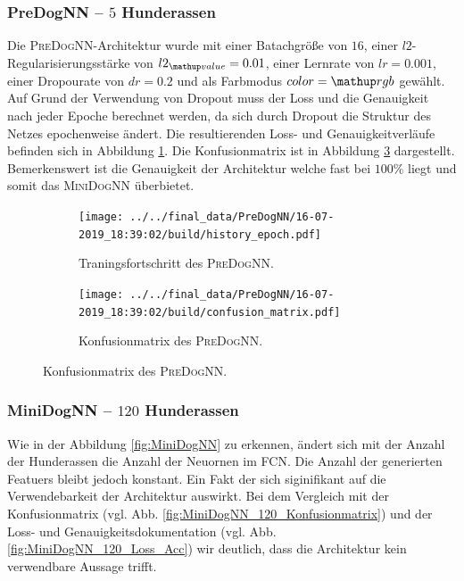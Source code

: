 \subsubsection{PreDogNN -- $5$ Hunderassen}
Die \textsc{PreDogNN}-Architektur wurde mit einer Batachgröße von $16$, einer
$l2$-Regularisierungsstärke von $l2\ua{value}=0.01$, einer Lernrate von
$lr=0.001$, einer Dropourate von $dr=0.2$ und als Farbmodus $color=\map{rgb}$ gewählt.
Auf Grund der Verwendung von Dropout muss der Loss und die Genauigkeit nach jeder
Epoche berechnet werden, da sich durch Dropout die Struktur des Netzes epochenweise
ändert. Die resultierenden Loss- und Genauigkeitverläufe befinden sich in Abbildung
\ref{fig:PreDogNN_Loss_Acc}. Die Konfusionmatrix ist in Abbildung \ref{fig:PreDogNN_Konfusionmatrix}
dargestellt. Bemerkenswert ist die Genauigkeit der Architektur welche fast
 bei $100\%$ liegt und somit das \textsc{MiniDogNN} überbietet.
\begin{figure}
\centering
\begin{subfigure}{0.48\textwidth}
\centering
\texttt{[image: ../../final\_data/PreDogNN/16-07-2019\_18:39:02/build/history\_epoch.pdf]}
\caption{Traningsfortschritt des \textsc{PreDogNN}.}
\label{fig:PreDogNN_Loss_Acc}
\end{subfigure}
\begin{subfigure}{0.48\textwidth}
\centering
\texttt{[image: ../../final\_data/PreDogNN/16-07-2019\_18:39:02/build/confusion\_matrix.pdf]}
\caption{Konfusionmatrix des \textsc{PreDogNN}.}
\label{fig:PreDogNN_Konfusionmatrix}
\end{subfigure}
\end{figure}

\subsubsection{MiniDogNN -- $120$ Hunderassen}
Wie in der Abbildung \ref{fig:MiniDogNN} zu erkennen, ändert sich mit der
Anzahl der Hunderassen die Anzahl der Neuornen im FCN. Die Anzahl der generierten
Featuers bleibt jedoch konstant. Ein Fakt der sich siginifikant auf die
Verwendebarkeit der Architektur auswirkt. Bei dem Vergleich mit der Konfusionmatrix
(vgl. Abb. \ref{fig:MiniDogNN_120_Konfusionmatrix}) und
der Loss- und Genauigkeitsdokumentation (vgl. Abb. \ref{fig:MiniDogNN_120_Loss_Acc})
wir deutlich, dass die Architektur kein verwendbare Aussage trifft.

